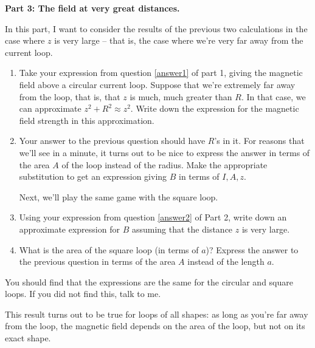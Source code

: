 \documentclass{article}
\begin{document}
\bigskip

{\bf Part 3: The field at very great distances.}

In this part, I want to consider the results of the previous
two calculations in the case where $z$ is very large -- that is,
the case where we're very far away from the current loop.

\begin{enumerate}
\item Take your expression from question \ref{answer1} of part 1,
giving the magnetic field above a circular current loop.
Suppose that we're extremely far away from the loop, that is,
that $z$ is much, much greater than $R$.  In that case, we can approximate
$z^2+R^2\approx z^2$.  Write down the expression for the magnetic
field strength in this approximation.  

\item Your answer to the previous question should have $R$'s in it.
For reasons that we'll see in a minute, it turns out to be nice
to express the answer in terms of the area $A$ of the loop instead of the
radius.  Make the appropriate substitution to get an expression
giving $B$ in terms of $I,A,z$.

Next, we'll play the same game with the square loop.  

\item Using your expression from question \ref{answer2} of Part 2,
write down an approximate expression for $B$ assuming that the distance
$z$ is very large.

\item What is the area of the square loop (in terms of $a$)?  
Express the answer to the previous question in terms of the area $A$
instead of the length $a$.
\end{enumerate}

You should find that the expressions are the same for the circular
and square loops.  If you did not find this, talk to me.  

This result turns out to be true for loops of all shapes: as long as you're
far away from the loop, the magnetic field depends on the area of the loop,
but not on its exact shape.
\end{document}
